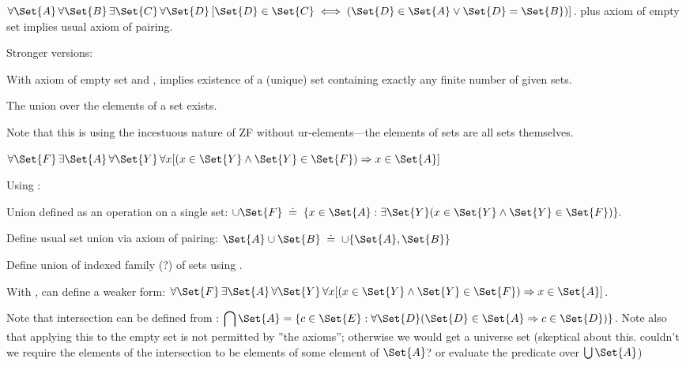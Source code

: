 ${\displaystyle 
\forall \Set{A}\,\forall \Set{B}\,
\exists \Set{C}\,
\forall \Set{D}\,[\Set{D}\in \Set{C}
\iff (\Set{D}\in \Set{A}\lor \Set{D}=\Set{B})]}$.
plus 
axiom of empty set
implies usual axiom of pairing.

Stronger versions:

With axiom of empty set\cite{wiki:Axiom_of_empty_set} 
and ,
implies existence of a (unique) set containing exactly
any finite number of given sets.

\label{sec:Axiom-of-union}

The union over the elements of a set 
exists\cite{wiki:Axiom_of_union}.

Note that this is using the incestuous nature of 
\textsf{ZF} without ur-elements---the elements of sets
are all sets themselves. 
 
$\forall {\Set{F}}\,
\exists \Set{A}\,
\forall \Set{Y}\,\forall x
[(x\in \Set{Y} \land \Set{Y}\in \Set{F})
\Rightarrow x\in \Set{A}]$

Using :

Union defined as an operation on a single set:\hfill\break
${\displaystyle 
\cup {\Set{F}} \; \doteq \;
\{x\in \Set{A}:\exists \Set{Y} 
(x \in \Set{Y} \land \Set{Y} \in \Set{F})\}.}$

Define usual set union via axiom of pairing:
$\Set{A} \cup \Set{B} \; \doteq \; \cup \{ \Set{A}, \Set{B}\}$

Define union of indexed family (?) of sets
using .

With ,
can define a weaker form:
$\forall {\Set{F}}\,\exists \Set{A}\,\forall \Set{Y}\,
\forall x
[(x\in \Set{Y} 
\land 
\Set{Y}\in {\Set{F}})
\Rightarrow 
x\in \Set{A}]$.

Note that intersection can be defined from 
:\hfill\linebreak
${\displaystyle 
\bigcap \Set{A}=\{c\in \Set{E}:
\forall \Set{D} (\Set{D} \in \Set{A} \Rightarrow c\in \Set{D})\}}$.
Note also that applying this to the empty set
is not permitted by ''the axioms'';
otherwise we would get a universe set 
(skeptical about this.
couldn't we require the elements of the intersection
to be elements of some element of $\Set{A}$?
or evaluate the predicate over $\bigcup \Set{A}$)

